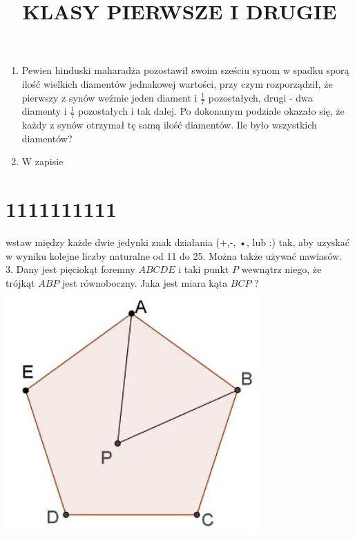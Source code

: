 \documentclass[10pt]{article}
\title{KLASY PIERWSZE I DRUGIE }
\author{}
\date{}
\begin{document}
\maketitle
\begin{enumerate}
  \item Pewien hinduski maharadża pozostawił swoim sześciu synom w spadku sporą ilość wielkich diamentów jednakowej wartości, przy czym rozporządził, że pierwszy z synów weźmie jeden diament i \(\frac{1}{7}\) pozostałych, drugi - dwa diamenty i \(\frac{1}{7}\) pozostałych i tak dalej. Po dokonanym podziale okazało się, że każdy z synów otrzymał tę samą ilość diamentów. Ile było wszystkich diamentów?
  \item W zapisie
\end{enumerate}

\section*{1111111111}
wstaw między każde dwie jedynki znak działania (+,-, •, lub :) tak, aby uzyskać w wyniku kolejne liczby naturalne od 11 do 25. Można także używać nawiasów.\\
3. Dany jest pięciokąt foremny \(A B C D E\) i taki punkt \(P\) wewnątrz niego, że trójkąt \(A B P\) jest równoboczny. Jaka jest miara kąta \(B C P\) ?\\
\includegraphics[max width=\textwidth, center]{2024_11_21_b77241a6b92a9bb65e10g-1}
\end{document}
